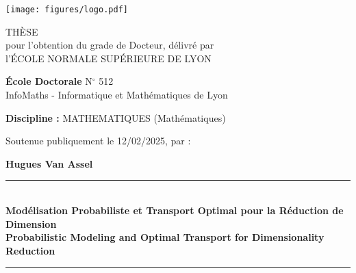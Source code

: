 
\begin{titlepage}
	
	\begin{center}
		\texttt{[image: figures/logo.pdf]}
		
		\vspace{30pt}
		
		{\Large {TH\`ESE \\ \vspace{1pt} pour l'obtention du grade de Docteur, délivré par \\ \vspace{8pt} l'\'ECOLE NORMALE SUP\'ERIEURE DE LYON}}
		
		\vspace{30pt}
		
		{\large \textbf{\'Ecole Doctorale} N$^\circ $ 512}\\
		{\large{InfoMaths - Informatique et Mathématiques de Lyon}}
		
		\vspace{28pt}
		
		{\large\textbf{Discipline :} MATHEMATIQUES (Mathématiques)}
		
		\vspace{20pt}
		
		Soutenue publiquement le 12/02/2025, par :\\
		
		\vspace{12pt}
		
		{\Large\textbf{Hugues Van Assel}}\\
	\end{center}
	
	\vspace{12pt}
	
	\begin{center}
		\noindent\rule{16cm}{0.25pt}\\
		\vspace{10pt}
		{\LARGE \textbf{Modélisation Probabiliste et Transport Optimal pour la Réduction de Dimension}}
		\\
		\vspace{5pt}
		{\LARGE \textbf{Probabilistic Modeling and Optimal Transport for Dimensionality Reduction}}
		\noindent\rule{16cm}{0.25pt}\\
	\end{center}
	
    \vspace{18pt}
	

\end{titlepage}
